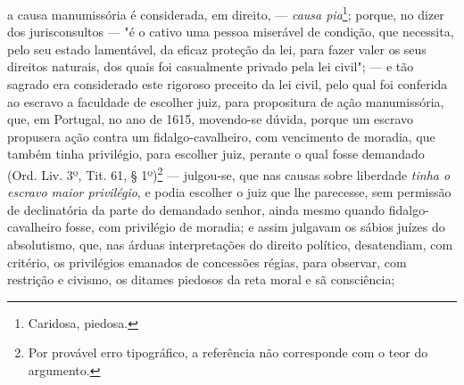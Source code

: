 a causa manumissória é considerada, em direito, --- \emph{causa
pia}\footnote{Caridosa, piedosa.}; porque, no dizer dos jurisconsultos
--- "é o cativo uma pessoa miserável de condição, que necessita, pelo
seu estado lamentável, da eficaz proteção da lei, para fazer valer os
seus direitos naturais, dos quais foi casualmente privado pela lei
civil"; --- e tão sagrado era considerado este rigoroso preceito da lei
civil, pelo qual foi conferida ao escravo a faculdade de escolher juiz,
para propositura de ação manumissória, que, em Portugal, no ano de 1615,
movendo-se dúvida, porque um escravo propusera ação contra um
fidalgo-cavalheiro, com vencimento de moradia, que também tinha
privilégio, para escolher juiz, perante o qual fosse demandado (Ord.
Liv. 3º, Tit. 61, § 1º)\footnote{Por provável erro tipográfico, a
  referência não corresponde com o teor do argumento.} --- julgou-se,
que nas causas sobre liberdade \emph{tinha o escravo maior privilégio},
e podia escolher o juiz que lhe parecesse, sem permissão de declinatória
da parte do demandado senhor, ainda mesmo quando fidalgo-cavalheiro
fosse, com privilégio de moradia; e assim julgavam os sábios juízes do
absolutismo, que, nas árduas interpretações do direito político,
desatendiam, com critério, os privilégios emanados de concessões régias,
para observar, com restrição e civismo, os ditames piedosos da reta
moral e sã consciência;

